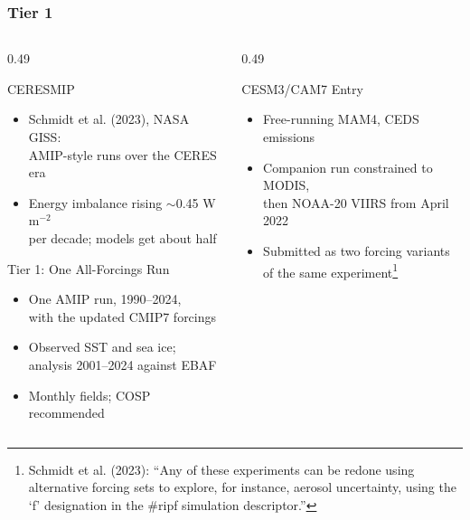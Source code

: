 \begin{frame}[t]
\frametitle{Tier 1}
\footnotesize
\begin{columns}[T]
\begin{column}{0.49\textwidth}
\begin{block}{CERESMIP}
\begin{itemize}
  \item Schmidt et al. (2023), NASA GISS:\\AMIP-style runs over the CERES era
  \item Energy imbalance rising $\sim$0.45 W m$^{-2}$\\per decade; models get about half
\end{itemize}
\end{block}
\begin{block}{Tier 1: One All-Forcings Run}
\begin{itemize}
  \item One AMIP run, 1990--2024,\\with the updated CMIP7 forcings
  \item Observed SST and sea ice;\\analysis 2001--2024 against EBAF
  \item Monthly fields; COSP recommended
\end{itemize}
\end{block}
\end{column}
\begin{column}{0.49\textwidth}
\begin{block}{CESM3/CAM7 Entry}
\begin{itemize}
  \item Free-running MAM4, CEDS emissions
  \item Companion run constrained to MODIS,\\then NOAA-20 VIIRS from April 2022
  \item Submitted as two forcing variants\\of the same experiment\footnote[frame]{\tiny Schmidt et al. (2023): ``Any of these experiments can be redone using alternative forcing sets to explore, for instance, aerosol uncertainty, using the `f' designation in the \#ripf simulation descriptor.''}

\end{itemize}
\end{block}
\end{column}
\end{columns}
\end{frame}
